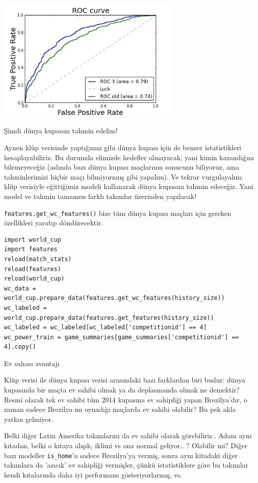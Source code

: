 \documentclass[12pt,fleqn]{article}\usepackage{../../common}
\begin{document}
\includegraphics[height=6cm]{stat_worldcup_02.png}

Şimdi dünya kupasını tahmin edelim!

Aynen klüp verisinde yaptığımız gibi dünya kupası için de benzer
istatistikleri hesaplayabiliriz. Bu durumda elimizde hedefler olmayacak,
yani kimin kazandığını bilemeyeceğiz (aslında bazı dünya kupası maçlarının
sonucunu biliyoruz, ama tahminlerimizi hiçbir maçı bilmiyormuş gibi
yapalım). Ve tekrar vurgulayalım: klüp verisiyle eğittiğimiz modeli
kullanarak dünya kupasını tahmin edeceğiz. Yani model ve tahmin tamamen
farklı takımlar üzerinden yapılacak!

\verb!features.get_wc_features()! bize tüm dünya kupası maçları için
gereken özellikleri yaratıp döndürecektir.

\begin{verbatim}
import world_cup
import features
reload(match_stats)
reload(features)
reload(world_cup)
wc_data = world_cup.prepare_data(features.get_wc_features(history_size))
wc_labeled = world_cup.prepare_data(features.get_features(history_size))
wc_labeled = wc_labeled[wc_labeled['competitionid'] == 4]
wc_power_train = game_summaries[game_summaries['competitionid'] == 4].copy()
\end{verbatim}

Ev sahası avantajı

Klüp verisi ile dünya kupası verisi arasındaki bazı farklardan biri budur:
dünya kupasında bir maçta ev sahibi olmak ya da deplasmanda olmak ne
demektir?  Resmi olarak tek ev sahibi tüm 2014 kupasına ev sahipliği yapan
Brezilya'dır, o zaman sadece Brezilya mı oynadığı maçlarda ev sahibi
olabilir? Bu pek akla yatkın gelmiyor.

Belki diğer Latin Amerika takımlarını da ev sahibi olarak
görebiliriz.. Adam aynı kıtadan, belki o kıtaya alışık, iklimi vs ona
normal geliyor.. ? Olabilir mi? Diğer bazı modeller \verb!is_home!'u sadece
Brezilya'ya vermiş, sonra aynı kitadaki diğer takımlara da 'azıcık' ev
sahipliği vermişler, çünkü istatistiklere göre bu takımlar kendi
kıtalarında daha iyi performans gösteriyorlarmış, vs.
\end{document}
